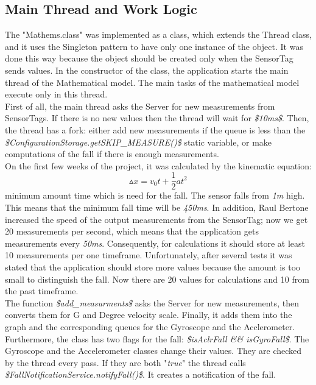 \documentclass[conference,12pt]{IEEETran}
\begin{document}
\subsection{Main Thread and Work Logic}
The "Mathems.class" was implemented as a class, which extends the Thread class, and it uses the Singleton pattern to have only one instance of the object. It was done this way because the object should be created only when the SensorTag sends values. In the constructor of the class, the application starts the main thread of the Mathematical model. The main tasks of the mathematical model execute only in this thread.\\
First of all, the main thread asks the Server for new measurements from SensorTags. If there is no new values then the thread will wait for \textit{\$10ms\$}. Then, the thread has a fork: either add new measurements if the queue is less than the \textit{\$ConfigurationStorage.getSKIP\_MEASURE()\$} static variable, or make computations of the fall if there is enough measurements.\\
On the first few weeks of the project, it was calculated by the kinematic equation:
$$ \vartriangle x = v_0t + \frac{1}{2}at^2 $$
minimum amount time which is need for the fall. The sensor falls from \textit{1m} high. This means that the minimum fall time will be \textit{450ms}. In addition, Raul Bertone increased the speed of the output measurements from the SensorTag; now we get 20 measurements per second, which means that the application gets measurements every \textit{50ms}. Consequently, for calculations it should store at least 10 measurements per one timeframe. Unfortunately, after several tests it was stated that the application should store more values because the amount is too small to distinguish the fall. Now there are 20 values for calculations and 10 from the past timeframe.\\
The function \textit{\$add\_measurments\$} asks the Server for new measurements, then converts them for G and Degree velocity scale. Finally, it adds them into the graph and the corresponding queues for the Gyroscope and the Acclerometer.\\
Furthermore, the class has two flags for the fall: \textit{\$isAclrFall \&\& isGyroFall\$}. The Gyroscope and the Accelerometer classes change their values. They are checked by the thread every pass. If they are both "\textit{true}" the thread calls \textit{\$FallNotificationService.notifyFall()\$}. It creates a notification of the fall.
\end{document}

